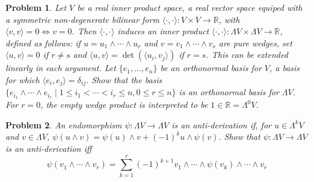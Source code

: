 \documentclass{article}
\newtheorem{plm}{Problem}
\begin{document}
\begin{plm}
  Let $V$ be a real  inner product space, a real vector space equiped with a symmetric non-degenerate bilinear form
  $\langle \cdot, \cdot \rangle: V \times V \to \mathbb{R}$, with $\langle v, v \rangle = 0 \Leftrightarrow v = 0$.
  Then $\langle \cdot, \cdot \rangle$ induces an inner product $\langle \cdot, \cdot \rangle: \Lambda V \times \Lambda V \to \mathbb{R}$,
  defined as follows: if $u = u_{1} \land \cdots \land u_{r}$ and $v = v_{1} \land \cdots \land v_{s}$ are pure wedges,
  set $\langle u, v \rangle = 0$ if $r \neq s$ and $\langle u, v \rangle = \det(\langle u_{i}, v_{j} \rangle)$ if $r = s$.
  This can be extended linearly in each argument.
  Let $\{e_{1}, \ldots, e_{n}\}$ be an \textit{orthonormal} basis for $V$, a basis for which $\langle e_{i}, e_{j} \rangle = \delta_{ij}$.
  Show that the basis $\{e_{i_{1}} \land \cdots \land e_{i_{r}} \mid 1 \leq i_{1} < \cdots < i_{r} \leq n, 0 \leq r \leq n\}$
  is an orthonormal basis for $\Lambda V$.
  For $r = 0$, the empty wedge product is interpreted to be $1 \in \mathbb{R} = \Lambda^{0}V$.
\end{plm}

\begin{plm}
  An endomorphism $\psi: \Lambda V \to \Lambda V$ is an \textit{anti-derivation} if, for $u \in \Lambda^{k}V$ and $v \in  \Lambda V$,
  $\psi(u \land v) = \psi(u) \land v + (-1)^{k}u \land \psi(v)$.
  Show that $\psi: \Lambda V \to \Lambda V$ is an anti-derivation iff
  \[
    \psi(v_{1} \land \cdots \land v_{r}) = \sum_{k = 1}^{r}(-1)^{k+1}v_{1} \land \cdots \land \psi(v_{k}) \land \cdots \land v_{r}
  \]
\end{plm}
\end{document}
